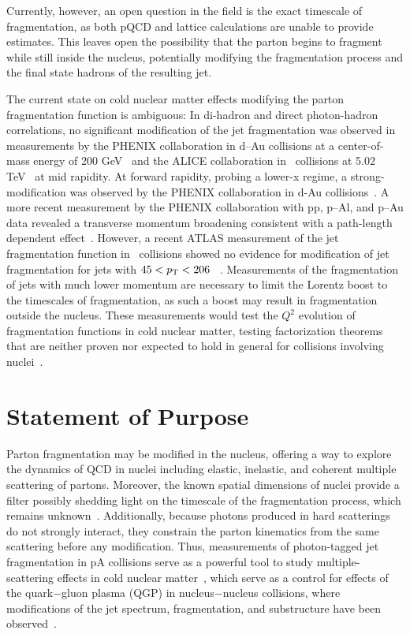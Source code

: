 Currently, however, an open question in the field is the exact timescale of fragmentation, as both pQCD and lattice calculations are unable to provide estimates. This leaves open the possibility that the parton begins to fragment while still inside the nucleus, potentially modifying the fragmentation process and the final state hadrons of the resulting jet.


The current state on cold nuclear matter effects modifying the parton fragmentation function is ambiguous: In di-hadron and direct photon-hadron correlations, no significant modification of the jet fragmentation was observed in measurements by the PHENIX collaboration in d--Au collisions at a center-of-mass energy of 200 GeV~\cite{Adler:2005ad} and the ALICE collaboration in \pPb~collisions at 5.02 TeV~\cite{Acharya:2018edi,Adam:2015xea} at mid rapidity. At forward rapidity, probing a lower-x regime, a strong-modification was observed by the PHENIX collaboration in d-Au collisions~\cite{Adare:2011sc}. A more recent measurement by the PHENIX collaboration with pp, p--Al, and p--Au data revealed a transverse momentum broadening consistent with a path-length dependent effect~\cite{Aidala:2018eqn}. However, a recent ATLAS measurement of the jet fragmentation function in \pPb~collisions showed no evidence for modification of jet fragmentation for jets with $45<p_{\mathrm{T}}<206$ \GeVc~\cite{Aaboud:2017tke}. Measurements of the fragmentation of jets with much lower momentum are necessary to limit the Lorentz boost to the timescales of fragmentation, as such a boost may result in fragmentation outside the nucleus. These measurements would test the $Q^{2}$ evolution of fragmentation functions in cold nuclear matter, testing factorization theorems that are neither proven nor expected to hold in general for collisions involving nuclei~\cite{deFlorian:2011fp}. 

\section{Statement of Purpose}

Parton fragmentation may be modified in the nucleus, offering a way to explore the dynamics of QCD in nuclei including elastic, inelastic, and coherent multiple scattering of partons. Moreover, the known spatial dimensions of nuclei provide a filter possibly shedding light on the timescale of the fragmentation process, which remains unknown~\cite{Accardi:2009qv,Accardi:2012qut}. Additionally, because photons produced in hard scatterings do not strongly interact, they constrain the parton kinematics from the same scattering before any modification. Thus, measurements of photon-tagged jet fragmentation in pA collisions serve as a powerful tool to study multiple-scattering effects in cold nuclear matter~\cite{Xing:2012ii}, which serve as a control for effects of the quark$-$gluon plasma (QGP) in nucleus$-$nucleus collisions, where modifications of the jet spectrum, fragmentation, and substructure have been observed~\cite{Connors:2017ptx}.

